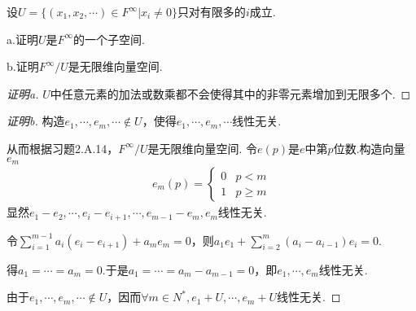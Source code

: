 \newpage

\begin{problem}[14]\label{3.E.14}
    设\(U=\{(x_1,x_2,\cdots)\in F^\infty | x_i \ne 0\}\)只对有限多的\(i\)成立.

    a.证明\(U\)是\(F^\infty\)的一个子空间.

    b.证明\(F^\infty /U\)是无限维向量空间.
\end{problem}

\begin{proof}[证明a]
    \(U\)中任意元素的加法或数乘都不会使得其中的非零元素增加到无限多个.
\end{proof}

\begin{proof}[证明b]
    构造\(e_1,\cdots,e_m,\cdots \notin U\)，使得\(e_1,\cdots,e_m,\cdots\)线性无关.

    从而根据习题2.A.14，\(F^\infty /U\)是无限维向量空间.
    令\(e(p)\)是\(e\)中第\(p\)位数.构造向量\(e_m\)
    \begin{align*}
        e_m(p)=
            \begin{cases}
                0 & p<m \\
                1 & p \geq m
            \end{cases}
    \end{align*}
    显然\(e_1-e_2,\cdots,e_i-e_{i+1},\cdots,e_{m-1}-e_m,e_m\)线性无关.
    
    令\(\sum_{i=1}^{m-1} a_i(e_i-e_{i+1})+a_me_m=0\)，则\(a_1e_1+\sum_{i=2}^m(a_i-a_{i-1})e_i=0\).
    
    得\(a_1=\cdots=a_m=0\).于是\(a_1=\cdots=a_m-a_{m-1}=0\)，即\(e_1,\cdots,e_m\)线性无关.
    
    由于\(e_1,\cdots,e_m,\cdots \notin U\)，因而\(\forall m \in N^*,e_1+U,\cdots,e_m+U\)线性无关.
\end{proof}

